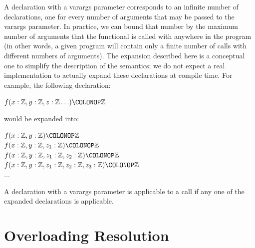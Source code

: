 A declaration with a varargs parameter corresponds to an infinite
number of declarations, one for every number of arguments that may be
passed to the varargs parameter.  In practice, we can bound that
number by the maximum number of arguments that the functional is
called with anywhere in the program (in other words, a given program
will contain only a finite number of calls with different numbers of
arguments).  The expansion described here is a conceptual one to
simplify the description of the semantics; we do not expect a real
implementation to actually expand these declarations at compile time.
%
For example, the following declaration:
\begin{Fortress}
\(f(x \mathrel{\mathtt{:}} \mathbb{Z}, y \mathrel{\mathtt{:}} \mathbb{Z}, z \mathrel{\mathtt{:}} \mathbb{Z}\ldots)\COLONOP\mathbb{Z}\)
\end{Fortress}
would be expanded into:
\begin{Fortress}
\(f(x \mathrel{\mathtt{:}} \mathbb{Z}, y \mathrel{\mathtt{:}} \mathbb{Z})\COLONOP\mathbb{Z}\)\\
\(f(x \mathrel{\mathtt{:}} \mathbb{Z}, y \mathrel{\mathtt{:}} \mathbb{Z}, z_{1} \mathrel{\mathtt{:}} \mathbb{Z})\COLONOP\mathbb{Z}\)\\
\(f(x \mathrel{\mathtt{:}} \mathbb{Z}, y \mathrel{\mathtt{:}} \mathbb{Z}, z_{1} \mathrel{\mathtt{:}} \mathbb{Z}, z_{2} \mathrel{\mathtt{:}} \mathbb{Z})\COLONOP\mathbb{Z}\)\\
\(f(x \mathrel{\mathtt{:}} \mathbb{Z}, y \mathrel{\mathtt{:}} \mathbb{Z}, z_{1} \mathrel{\mathtt{:}} \mathbb{Z}, z_{2} \mathrel{\mathtt{:}} \mathbb{Z}, z_{3} \mathrel{\mathtt{:}} \mathbb{Z})\COLONOP\mathbb{Z}\)\\
\(\ldots\)
\end{Fortress}
A declaration with a varargs parameter is applicable to a call if
any one of the expanded declarations is applicable.



\section{Overloading Resolution}



